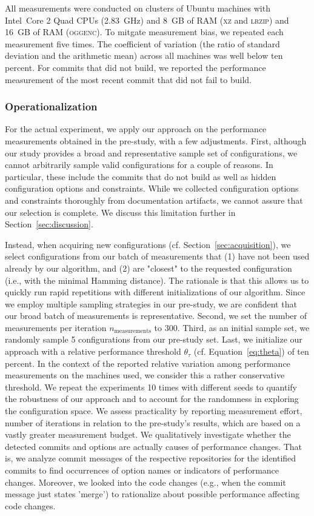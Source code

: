 \documentclass[sigconf]{acmart}
\begin{document}
	All measurements were conducted on clusters of Ubuntu machines with Intel~Core
	2 Quad CPUs (2.83~GHz) and 8~GB of RAM (\textsc{xz} and \textsc{lrzip}) and 16~GB of RAM (\textsc{oggenc}). To mitgate measurement bias, we repeated each measurement five times. The coefficient of variation (the ratio of standard deviation and the arithmetic mean) across all machines was well below ten percent. For commits that did not build, we reported the performance measurement of the most recent commit that did not fail to build.
	
	\subsubsection{Operationalization}\label{sec:rq2_operationalization}
	For the actual experiment, we apply our approach on the performance measurements obtained in the pre-study, with a few adjustments.
	First, although our study provides a broad and representative sample set of configurations, we cannot arbitrarily sample valid configurations for a couple of reasons. In particular, these include the commits that do not build as well as hidden configuration options and constraints. While we collected configuration options and constraints thoroughly from documentation artifacts, we cannot assure that our selection is complete. We discuss this limitation further in Section~\ref{sec:discussion}.
	
	Instead, when acquiring new configurations (cf. Section~\ref{sec:acquisition}), we select configurations from our batch of measurements that (1) have not been used already by our algorithm, and (2) are "closest" to the requested configuration (i.e., with the minimal Hamming distance). The rationale is that this allows us to quickly run rapid repetitions with different initializations of our algorithm. Since we employ multiple sampling strategies in our pre-study, we are confident that our broad batch of measurements is representative. Second, we set the number of measurements per iteration $n_\text{measurements}$ to 300. Third, as an initial sample set, we randomly sample 5 configurations from our pre-study set. 
	Last, we initialize our approach with a relative performance threshold $\theta_\tau$ (cf. Equation~\ref{eq:theta}) of ten percent. In the context of the reported relative variation among performance measurements on the machines used, we consider this a rather conservative threshold. 
	We repeat the experiments 10 times with different seeds to quantify the robustness of our approach and to account for the randomness in exploring the configuration space.
	We assess practicality by reporting measurement effort, number of iterations in relation to the pre-study's results, which are based on a vastly greater measurement budget.
	We qualitatively investigate whether the detected commits and options are actually causes of performance changes. That is, we analyze commit messages of the respective repositories for the identified commits to find occurrences of option names or indicators of performance changes. Moreover, we looked into the code changes (e.g., when the commit message just states 'merge') to rationalize about possible performance affecting code changes.
	
\end{document}
